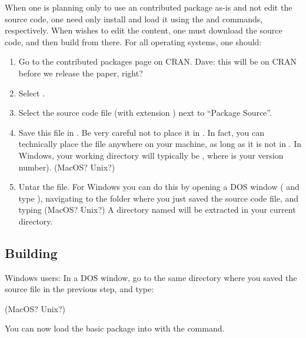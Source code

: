 \documentclass[article]{jss}
\begin{document}
When one is planning only to use an  contributed package as-is and not edit the source code, one need only install and load it using the  and  commands, respectively.  When wishes to edit the content, one must download the source code, and then build from there. For all operating systems, one should:

\begin{enumerate}
\item Go to the contributed packages page on CRAN. Dave: this will be on CRAN before we release the paper, right?
\item Select .
\item Select the source code file (with extension ) next to ``Package Source''.
\item Save this file in .  Be very careful not to place it in . In fact, you can technically place the file anywhere on your machine, as long as it is not in .  In Windows, your  working directory will typically be , where  is your  version number). (MacOS? Unix?)
\item Untar the file.  For Windows you can do this by opening a DOS window ( and type ), navigating to the folder where you just saved the source code file, and typing  (MacOS? Unix?) A directory named  will be extracted in your current directory.
\end{enumerate}

\subsection[Building ergmuserterms]{Building }
\label{BuildEUT}

Windows users: In a DOS window, go to the same directory where you saved the  source file in the previous step, and type:


(MacOS? Unix?)

You can now load the basic  package into  with the  command.
\end{document}
